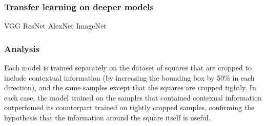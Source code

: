 \documentclass[../main.tex]{subfiles}
\begin{document}
\subsubsection{Transfer learning on deeper models}
VGG \cite{simonyan2015}
ResNet \cite{he2016}
AlexNet \cite{krizhevsky2017}
ImageNet \cite{deng2009}



\subsubsection{Analysis}
Each model is trained separately on the dataset of squares that are cropped to include contextual information (by increasing the bounding box by 50\% in each direction), and the same samples except that the squares are cropped tightly.
In each case, the model trained on the samples that contained contexual information outperfomed its counterpart trained on tightly cropped samples, confirming the hypothesis that the information around the square itself is useful.
\end{document}
